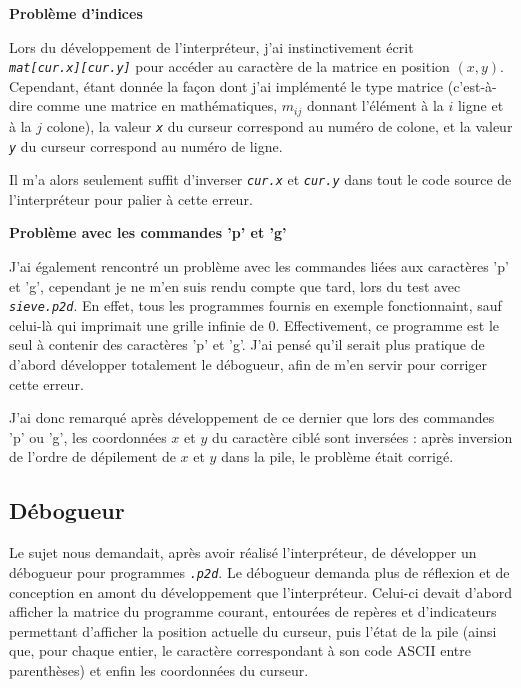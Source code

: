 \documentclass[a4paper,11pt]{article}
\newcommand{\code}[1]{{\itshape\lstinline{#1}}}
\begin{document}
{\small\textbf{Problème d'indices}}

Lors du développement de l'interpréteur, j'ai instinctivement écrit \\\code{mat[cur.x][cur.y]} pour accéder au caractère de la matrice en position $(x, y)$. Cependant, étant donnée la façon dont j'ai implémenté le type matrice (c'est-à-dire comme une matrice en mathématiques, $m_{ij}$ donnant l'élément à la $i$ ligne et à la $j$ colone), la valeur \code{x} du curseur correspond au numéro de colone, et la valeur \code{y} du curseur correspond au numéro de ligne.

Il m'a alors seulement suffit d'inverser \code{cur.x} et \code{cur.y} dans tout le code source de l'interpréteur pour palier à cette erreur.

\bigskip

{\small\textbf{Problème avec les commandes 'p' et 'g'}}

J'ai également rencontré un problème avec les commandes liées aux caractères 'p' et 'g', cependant je ne m'en suis rendu compte que tard, lors du test avec \code{sieve.p2d}. En effet, tous les programmes fournis en exemple fonctionnaint, sauf celui-là qui imprimait une grille infinie de 0. Effectivement, ce programme est le seul à contenir des caractères 'p' et 'g'. J'ai pensé qu'il serait plus pratique de d'abord développer totalement le débogueur, afin de m'en servir pour corriger cette erreur.

J'ai donc remarqué après développement de ce dernier que lors des commandes 'p' ou 'g', les coordonnées $x$ et $y$ du caractère ciblé sont inversées : après inversion de l'ordre de dépilement de $x$ et $y$ dans la pile, le problème était corrigé.



\subsection*{Débogueur}

Le sujet nous demandait, après avoir réalisé l'interpréteur, de développer un débogueur pour programmes \code{.p2d}. Le débogueur demanda plus de réflexion et de conception en amont du développement que l'interpréteur. Celui-ci devait d'abord afficher la matrice du programme courant, entourées de repères et d'indicateurs permettant d'afficher la position actuelle du curseur, puis l'état de la pile (ainsi que, pour chaque entier, le caractère correspondant à son code ASCII entre parenthèses) et enfin les coordonnées du curseur.
\end{document}
